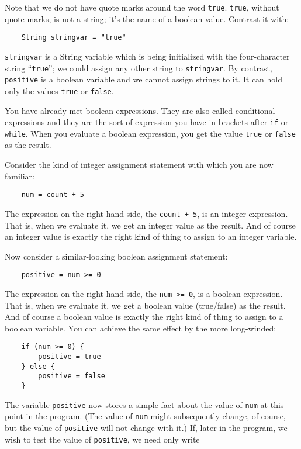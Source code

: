 Note that we do not have quote marks around the word \texttt{true}.  
\texttt{true}, without quote marks, is not a string; it's the name of a
boolean value.  Contrast it with:

\begin{Verbatim}
    String stringvar = "true"
\end{Verbatim}

\texttt{stringvar} is a String variable which is being initialized
with the four-character string ``\texttt{true}''; we could assign any
other string to \texttt{stringvar}. By contrast, \texttt{positive}
is a boolean variable and we cannot assign strings to it.
It can hold only the values \texttt{true} or \texttt{false}.

You have already met boolean expressions.  They are also called conditional
expressions and they are the sort of expression you have in brackets
after \texttt{if} or \texttt{while}.  When you evaluate a boolean expression,
you get the value \texttt{true} or \texttt{false} as the result.

Consider the kind of integer assignment statement with which you are
now familiar:

\begin{Verbatim}
    num = count + 5
\end{Verbatim}

The expression on the right-hand side, the \texttt{count + 5}, is an
integer expression.  That is, when we evaluate it, we get an integer value
as the result.  And of course an integer value is exactly the right kind of
thing to assign to an integer variable.

Now consider a similar-looking boolean assignment statement:

\begin{Verbatim}
    positive = num >= 0
\end{Verbatim}

The expression on the right-hand side, the \texttt{num >= 0}, is a
boolean expression.  That is, when we evaluate it, we get a boolean value
(true/false) as the result.  And of course a boolean value is exactly the
right kind of thing to assign to a boolean variable.  You can achieve
the same effect by the more long-winded:

\begin{Verbatim}
    if (num >= 0) {
        positive = true
    } else {
        positive = false
    }
\end{Verbatim}

The variable \texttt{positive} now stores a simple fact about the value of
 \texttt{num} at this point in the program.  (The value of  \texttt{num} might
subsequently change, of course, but the value of \texttt{positive} will not
change with it.)  If, later in the program, we wish to test
the value of \texttt{positive}, we need only write

